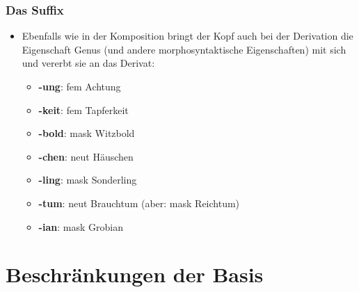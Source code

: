 
\begin{frame}
\frametitle{Das Suffix}

\begin{itemize}
	\item Ebenfalls wie in der Komposition bringt der Kopf auch bei der Derivation die Eigenschaft Genus (und andere morphosyntaktische Eigenschaften) mit sich und vererbt sie an das Derivat:
	
\vspace{1em}
	
	\begin{itemize}
		\item \textbf{-ung}: fem Achtung
		\item \textbf{-keit}: fem Tapferkeit
		\item \textbf{-bold}: mask Witzbold
		\item \textbf{-chen}: neut Häuschen
		\item \textbf{-ling}: mask Sonderling
		\item \textbf{-tum}: neut Brauchtum (aber: mask Reichtum)
		\item \textbf{-ian}: mask Grobian
	\end{itemize}
	
\end{itemize}


\end{frame}


\section{Beschränkungen der Basis}


